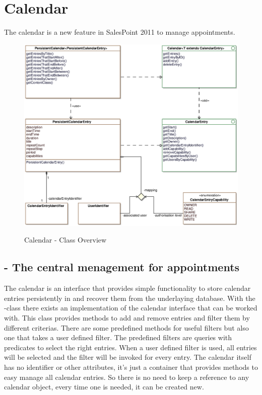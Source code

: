 \section{Calendar}

The calendar is a new feature in SalesPoint 2011 to manage appointments. 

\begin{figure}[ht]
	\centering
  \includegraphics[scale =.65]{images/Calendar_Overview.eps}
	\label{calendar_overview}
	\caption{Calendar - Class Overview}
\end{figure}

\subsection{ - The central menagement for appointments}
The calendar is an interface that provides simple functionality to store calendar entries persistently in and recover them from the underlaying database.
With the -class there exists an implementation of the calendar interface that can be worked with. This class provides methods
to add and remove entries and filter them by different criterias.
There are some predefined methods for useful filters but also one that takes a user defined filter. The predefined filters are queries with predicates to select the right entries. When a user defined filter is used, all entries will be selected and the filter will be invoked for every entry.  
The  calendar itself has no identifier or other attributes, it's just a container that provides methods to easy manage all calendar entries.
So there is no need to keep a reference to any calendar object, every time one is needed, it can be created new.


